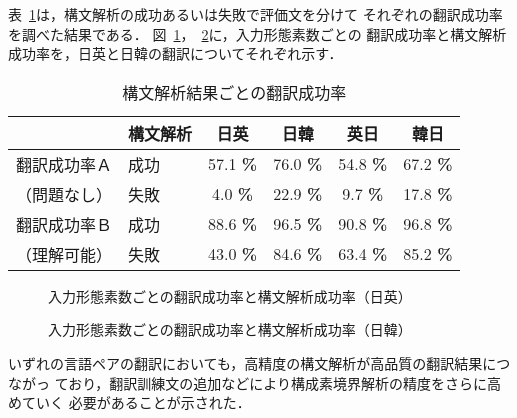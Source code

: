 表~\ref{st-rank}は，構文解析の成功あるいは失敗で評価文を分けて
それぞれの翻訳成功率を調べた結果である．
図~\ref{word-rate-je}，~\ref{word-rate-jk}に，入力形態素数ごとの
翻訳成功率と構文解析成功率を，日英と日韓の翻訳についてそれぞれ示す．

\begin{table}[bht]
\begin{center}
 \caption{構文解析結果ごとの翻訳成功率}
 \label{st-rank}
\begin{small}
\begin{tabular}{|l|l||c|c|c|c|} \hline
         &  構文解析  & 日英  & 日韓 & 英日 & 韓日 \\   \hline
翻訳成功率Ａ & 成功 
             & 57.1 {\tiny\bf \%} &  76.0 {\tiny\bf \%} & 54.8 {\tiny\bf \%} & 67.2 {\tiny\bf \%} \\ \cline{2-6}
（問題なし）& 失敗 
             & 4.0 {\tiny\bf \%} & 22.9 {\tiny\bf \%} & 9.7 {\tiny\bf \%} & 17.8 {\tiny\bf \%}\\ \hline
翻訳成功率Ｂ & 成功 
             & 88.6 {\tiny\bf \%} &  96.5 {\tiny\bf \%} & 90.8 {\tiny\bf \%} &  96.8 {\tiny\bf \%} \\ \cline{2-6}
（理解可能）& 失敗
             & 43.0 {\tiny\bf \%} &  84.6 {\tiny\bf \%} & 63.4 {\tiny\bf \%} & 85.2 {\tiny\bf \%}\\ \hline 
\end{tabular}
\end{small}
\end{center}
\end{table}

\begin{figure}[htb]
\begin{center}
\caption{入力形態素数ごとの翻訳成功率と構文解析成功率（日英）}
\label{word-rate-je}
\end{center}

\end{figure}

\begin{figure}[htb]
\begin{center}
\caption{入力形態素数ごとの翻訳成功率と構文解析成功率（日韓）}
\label{word-rate-jk}
\end{center}

\end{figure}

いずれの言語ペアの翻訳においても，高精度の構文解析が高品質の翻訳結果につながっ
ており，翻訳訓練文の追加などにより構成素境界解析の精度をさらに高めていく
必要があることが示された．


